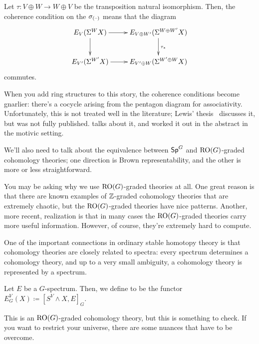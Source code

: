 Let $\tau\colon V\oplus W\to W\oplus V$ be the transposition natural isomorphism. Then, the coherence condition on
the $\sigma_{(\text{--})}$ means that the diagram
\[\xymatrix{
	E_V(\Sigma^W X)\ar[r]\ar[d] & E_{V\oplus W'}(\Sigma^{W\oplus W'}X)\ar[d]^{\tau_*}\\
	E_{V'}(\Sigma^{W'}X)\ar[r] & E_{V'\oplus W}(\Sigma^{W'\oplus W}X)
}\]
commutes.
\begin{rem}
When you add ring structures to this story, the coherence conditions become gnarlier: there's a cocycle arising
from the pentagon diagram for associativity. Unfortunately, this is not treated well in the literature; Lewis'
thesis~\cite{LewisThesis} discusses it, but was not fully published. \cite[Appendix A]{LewisMandell} talks about
it, and  worked it out in the abstract in the motivic setting.
\end{rem}
We'll also need to talk about the equivalence between $\mathsf{Sp}^G$ and $\mathrm{RO}(G)$-graded cohomology theories; one
direction is Brown representability, and the other is more or less straightforward.

You may be asking why we use $\mathrm{RO}(G)$-graded theories at all. One great reason is that there are known examples of
$\mathbb Z$-graded cohomology theories that are extremely chaotic, but the $\mathrm{RO}(G)$-graded theories have nice patterns.
Another, more recent, realization is that in many cases the $\mathrm{RO}(G)$-graded theories carry more useful information.
However, of course, they're extremely hard to compute.

%
One of the important connections in ordinary stable homotopy theory is that cohomology theories are closely related
to spectra: every spectrum determines a cohomology theory, and up to a very small ambiguity, a cohomology theory is
represented by a spectrum.
\begin{defn}
Let $E$ be a $G$-spectrum. Then, we define  to be the functor $E_G^V(X)\coloneqq [S^V\wedge X,
E]_G$.
\end{defn}
This is an $\mathrm{RO}(G)$-graded cohomology theory, but this is something to check. If you want to restrict your
universe, there are some nuances that have to be overcome.

